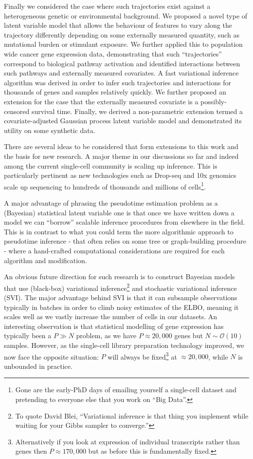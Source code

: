 Finally we considered the case where such trajectories exist against a heterogeneous genetic or environmental background. We proposed a novel type of latent variable model that allows the behaviour of features to vary along the trajectory differently depending on some externally measured quantity, such as mutational burden or stimulant exposure. We further applied this to population wide cancer gene expression data, demonstrating that such ``trajectories'' correspond to biological pathway activation and identified interactions between such pathways and externally measured covariates. A fast variational inference algorithm was derived in order to infer such trajectories and interactions for thousands of genes and samples relatively quickly. We further proposed an extension for the case that the externally measured covariate is a possibly-censored survival time. Finally, we derived a non-parametric extension termed a covariate-adjusted Gaussian process latent variable model and demonstrated its utility on some synthetic data.

There are several ideas to be considered that form extensions to this work and the basis for new research. A major theme in our discussions so far and indeed among the current single-cell community is scaling up inference. This is particularly pertinent as new technologies such as Drop-seq and 10x genomics scale up sequencing to hundreds of thousands and millions of cells\footnote{
   Gone are the early-PhD days of emailing yourself a single-cell dataset and pretending to everyone else that you work on ``Big Data''.
}. 

A major advantage of phrasing the pseudotime estimation problem as a (Bayesian) statistical latent variable one is that once we have written down a model we can ``borrow'' scalable inference procedures from elsewhere in the field. This is in contrast to what you could term the more algorithmic approach to pseudotime inference - that often relies on some tree or graph-building procedure - where a hand-crafted computational considerations are required for each algorithm and modification.

An obvious future direction for such research is to construct Bayesian models that use (black-box) variational inference\footnote{
    To quote David Blei, ``Variational inference is that thing you implement while waiting for your Gibbs sampler to converge.''
} and stochastic variational inference (SVI). The major advantage behind SVI is that it can subsample observations typically in batches in order to climb noisy estimates of the ELBO, meaning it scales well as we vastly increase the number of cells in our datasets. An interesting observation is that statistical modelling of gene expression has typically been a $P \gg N$ problem, as we have $P \approx 20,000$ genes but $N \sim \mathcal{O}(10)$ samples. However, as the single-cell library preparation technology improved, we now face the opposite situation: $P$ will always be fixed\footnote{
Alternatively if you look at expression of individual transcripts rather than genes then $P \approx 170,000$ but as before this is fundamentally fixed.
} at $\approx 20,000$, while $N$ is  unbounded in practice.


